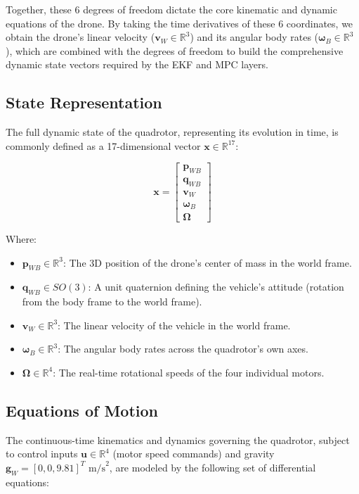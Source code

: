 \documentclass{article}
\begin{document}
Together, these 6 degrees of freedom dictate the core kinematic and dynamic equations of the drone. By taking the time derivatives of these 6 coordinates, we obtain the drone's linear velocity ($\mathbf{v}_W \in \mathbb{R}^3$) and its angular body rates ($\boldsymbol{\omega}_B \in \mathbb{R}^3$), which are combined with the degrees of freedom to build the comprehensive dynamic state vectors required by the EKF and MPC layers.

\subsection{State Representation}
The full dynamic state of the quadrotor, representing its evolution in time, is commonly defined as a 17-dimensional vector $\mathbf{x} \in \mathbb{R}^{17}$:

\begin{equation}
    \mathbf{x} = 
    \begin{bmatrix} 
    \mathbf{p}_{WB} \\ 
    \mathbf{q}_{WB} \\ 
    \mathbf{v}_W \\ 
    \boldsymbol{\omega}_B \\ 
    \boldsymbol{\Omega} 
    \end{bmatrix}
\end{equation}

Where:
\begin{itemize}
    \item $\mathbf{p}_{WB} \in \mathbb{R}^3$: The 3D position of the drone's center of mass in the world frame.
    \item $\mathbf{q}_{WB} \in SO(3)$: A unit quaternion defining the vehicle's attitude (rotation from the body frame to the world frame).
    \item $\mathbf{v}_W \in \mathbb{R}^3$: The linear velocity of the vehicle in the world frame.
    \item $\boldsymbol{\omega}_B \in \mathbb{R}^3$: The angular body rates across the quadrotor's own axes.
    \item $\boldsymbol{\Omega} \in \mathbb{R}^4$: The real-time rotational speeds of the four individual motors.
\end{itemize}

\subsection{Equations of Motion}
The continuous-time kinematics and dynamics governing the quadrotor, subject to control inputs $\mathbf{u} \in \mathbb{R}^4$ (motor speed commands) and gravity $\mathbf{g}_W = [0, 0, 9.81]^T \text{ m/s}^2$, are modeled by the following set of differential equations:
\end{document}
